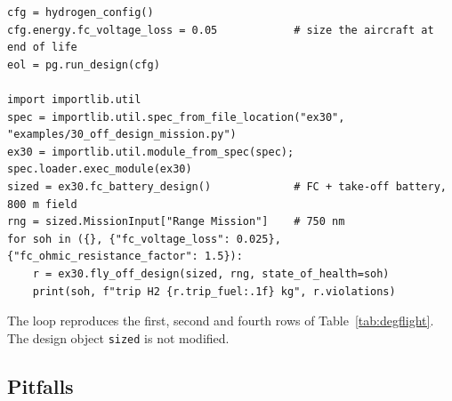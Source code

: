 \documentclass[a4paper,11pt]{article}
\newcommand{\code}[1]{\nolinkurl{#1}}
\begin{document}
\begin{lstlisting}
cfg = hydrogen_config()
cfg.energy.fc_voltage_loss = 0.05            # size the aircraft at end of life
eol = pg.run_design(cfg)

import importlib.util
spec = importlib.util.spec_from_file_location("ex30", "examples/30_off_design_mission.py")
ex30 = importlib.util.module_from_spec(spec); spec.loader.exec_module(ex30)
sized = ex30.fc_battery_design()             # FC + take-off battery, 800 m field
rng = sized.MissionInput["Range Mission"]    # 750 nm
for soh in ({}, {"fc_voltage_loss": 0.025}, {"fc_ohmic_resistance_factor": 1.5}):
    r = ex30.fly_off_design(sized, rng, state_of_health=soh)
    print(soh, f"trip H2 {r.trip_fuel:.1f} kg", r.violations)
\end{lstlisting}
The loop reproduces the first, second and fourth rows of Table~\ref{tab:degflight}. The design
object \code{sized} is not modified.

\subsection{Pitfalls}
\end{document}
